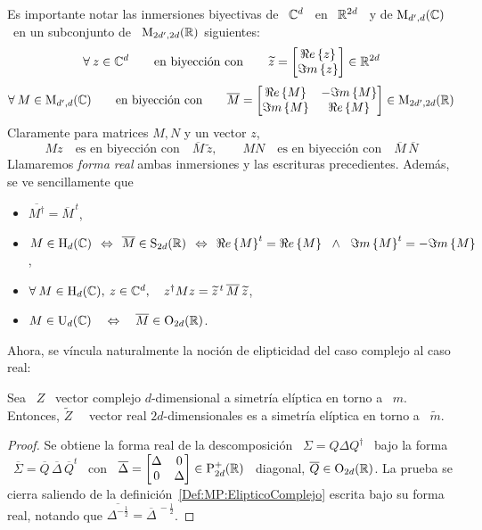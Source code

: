 Es importante notar  las inmersiones biyectivas de \ $\mathbb{C}^d$  \ en \ $\mathbb{R}^{2
  d}$ \  y de $\mathrm{M}_{d',d}(\mathbb{C})$ \  en un subconjunto de  \ $\mathrm{M}_{2 d', 2d}(\mathbb{R})$
siguientes:
%
\[
\forall \: z  \in \mathbb{C}^d \qquad \mbox{en biyecci\'on  con} \qquad \widetilde{z}
= \begin{bmatrix} \Re e \left\{ z \right\}\\ \Im m \left\{ z \right\} \end{bmatrix} \in \mathbb{R}^{2 d}
\]
%
\[
\forall  \:  M \in  \mathrm{M}_{d',d}(\mathbb{C})  \qquad  \mbox{en  biyecci\'on con}  \qquad
\overline{M}   =   \begin{bmatrix}   \Re e \left\{ M \right\}   &  -   \Im m \left\{ M \right\}\\   \Im m \left\{ M \right\}   &
  \Re e \left\{ M \right\} \end{bmatrix} \in \mathrm{M}_{2d',2d}(\mathbb{R})
\]
%
Claramente para matrices $M, N$ y un vector $z$,
%
\[
M z \quad \mbox{es en biyecci\'on con} \quad \overline{M} \, \widetilde{z}, \qquad
M N \quad \mbox{es en biyecci\'on con} \quad \overline{M} \, \overline{N}
\]
%
Llamaremos   {\em    forma   real}   ambas   inmersiones    y   las   escrituras
precedientes. Adem\'as, se ve sencillamente que
%
\begin{itemize}
\item  $\displaystyle   \overline{M^\dag}  =  \overline{M}^{\,   t}$,
%
\item $\displaystyle M \in \mathrm{H}_d(\mathbb{C}) \:\: \Leftrightarrow \:\:
  \overline{M}  \in  \mathrm{S}_{2d}(\mathbb{R})  \:\:  \Leftrightarrow  \:\:  \Re e \left\{ M \right\}^t  =
  \Re e \left\{ M \right\} \, \:\: \wedge \:\: \, \Im m \left\{ M \right\}^t = - \Im m \left\{ M \right\}$,
%
\item  $\forall \:  M \in  \mathrm{H}_d(\mathbb{C}), \:  z  \in \mathbb{C}^d,  \quad z^\dag  M z  =
  \widetilde{z}^{\, t} \, \overline{M} \, \widetilde{z}$,
%
\item $M \in \mathrm{U}_d(\mathbb{C}) \quad \Leftrightarrow \quad \overline{M} \in \mathrm{O}_{2d}(\mathbb{R})$.
\end{itemize}
%

Ahora, se v\'incula naturalmente la noci\'on de elipticidad del caso complejo al
caso real:
%
\begin{lema}
  Sea \ $Z$ \ vector complejo  $d$-dimensional a simetr\'ia el\'iptica en torno a
  \  $m$.  Entonces,  $\widetilde{Z}$ \  \ vector  real $2d$-dimensionales  es a
  simetr\'ia el\'iptica en torno a \ $\widetilde{m}$.
\end{lema}
%
\begin{proof}
  Se obtiene la forma real de la descomposici\'on \ $\Sigma = Q \Delta Q^\dag$ \
  bajo  la forma  \ $\overline{\Sigma}  = \overline{Q}  \,  \overline{\Delta} \,
  \overline{Q}^t$ \ con \ $\overline{\Delta}  = \begin{bmatrix} \Delta & 0\\ 0 &
    \Delta  \end{bmatrix}  \in \mathrm{P}_{2d}^+(\mathbb{R})$  \  diagonal, $\overline{Q}  \in
  \mathrm{O}_{2d}(\mathbb{R})$.      La     prueba    se     cierra     saliendo    de     la
  definici\'on~\ref{Def:MP:ElipticoComplejo} escrita bajo su forma real, notando
  que $\overline{\Delta^{-\frac12}} = \overline{\Delta}^{\: -\frac12}$.
\end{proof}

